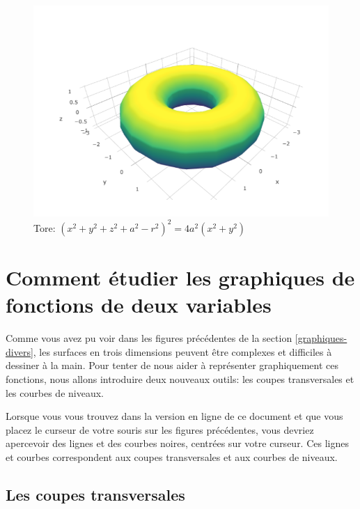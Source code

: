 \documentclass[]{book}
\theoremstyle{definition}
\theoremstyle{definition}
\theoremstyle{definition}
\theoremstyle{remark}
\let\BeginKnitrBlock\begin \let\EndKnitrBlock\end
\begin{document}
\begin{figure}

{\centering \includegraphics[width=0.8\linewidth]{resources/images/tore} 

}

\caption{Tore: $(x^2+y^2+z^2+a^2-r^2)^2=4 a^2(x^2+y^2)$}\label{fig:tore}
\end{figure}

\hypertarget{comment-etudier-les-graphiques-de-fonctions-de-deux-variables}{%
\section{Comment étudier les graphiques de fonctions de deux
variables}\label{comment-etudier-les-graphiques-de-fonctions-de-deux-variables}}

Comme vous avez pu voir dans les figures précédentes de la section
\ref{graphiques-divers}, les surfaces en trois dimensions peuvent être
complexes et difficiles à dessiner à la main. Pour tenter de nous aider
à représenter graphiquement ces fonctions, nous allons introduire deux
nouveaux outils: les coupes transversales et les courbes de niveaux.

\BeginKnitrBlock{remark}
{}Lorsque vous vous trouvez dans la version
en ligne de ce document et que vous placez le curseur de votre souris
sur les figures précédentes, vous devriez apercevoir des lignes et des
courbes noires, centrées sur votre curseur. Ces lignes et courbes
correspondent aux coupes transversales et aux courbes de niveaux.
\EndKnitrBlock{remark}

\hypertarget{les-coupes-transversales}{%
\subsection{Les coupes transversales}\label{les-coupes-transversales}}
\end{document}
